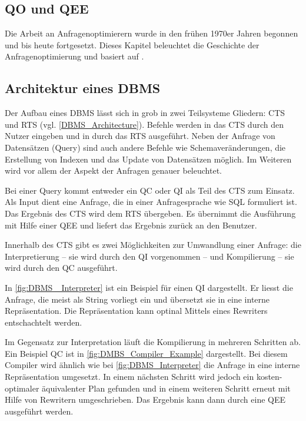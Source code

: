 

\subsection{\ac{QO} und \ac{QEE}}
Die Arbeit an Anfragenoptimierern wurde in den frühen 1970er Jahren begonnen und bis heute fortgesetzt. Dieses Kapitel beleuchtet die Geschichte der Anfragenoptimierung und basiert auf \cite{chaudhuri1998overview}.


\newpage
\subsection{Architektur eines \ac{DBMS}}

Der Aufbau eines \ac{DBMS} lässt sich in grob in zwei Teilsysteme Gliedern: \ac{CTS} und \ac{RTS} (vgl. \ref{DBMS_Architecture}).  Befehle werden in das \ac{CTS} durch den Nutzer eingeben und in durch das \ac{RTS} ausgeführt. Neben der Anfrage von Datensätzen (Query) sind auch andere Befehle wie Schemaveränderungen, die Erstellung von Indexen und das Update von Datensätzen möglich. Im Weiteren wird vor allem der Aspekt der Anfragen genauer beleuchtet.

Bei einer Query kommt entweder ein \ac{QC} oder \ac{QI} als Teil des \ac{CTS} zum Einsatz. Als Input dient eine Anfrage, die in einer Anfragesprache wie \ac{SQL} formuliert ist. Das Ergebnis des \ac{CTS} wird dem \ac{RTS} übergeben. Es übernimmt die Ausführung mit Hilfe einer \ac{QEE} und liefert das Ergebnis zurück an den Benutzer.

Innerhalb des \ac{CTS} gibt es zwei Möglichkeiten zur Umwandlung einer Anfrage: die Interpretierung – sie wird durch den \ac{QI} vorgenommen – und Kompilierung – sie wird durch den \ac{QC} ausgeführt. 

In \ref{fig:DBMS _Interpreter} ist ein Beispiel für einen \ac{QI} dargestellt. Er liesst die Anfrage, die meist als String vorliegt ein und übersetzt sie in eine interne Repräsentation. Die Repräsentation kann optinal Mittels eines Rewriters entschachtelt werden.

Im Gegensatz zur Interpretation läuft die Kompilierung in mehreren Schritten ab. Ein Beispiel \ac{QC} ist in \ref{fig:DMBS_Compiler_Example} dargestellt. Bei diesem Compiler wird ähnlich wie bei \ref{fig:DBMS_Interpreter} die Anfrage in eine interne Repräsentation umgesetzt. In einem nächsten Schritt wird jedoch ein kosten-optimaler äquivalenter Plan gefunden und in einem weiteren Schritt erneut mit Hilfe von Rewritern umgeschrieben. Das Ergebnis kann dann durch eine \ac{QEE} ausgeführt werden.

